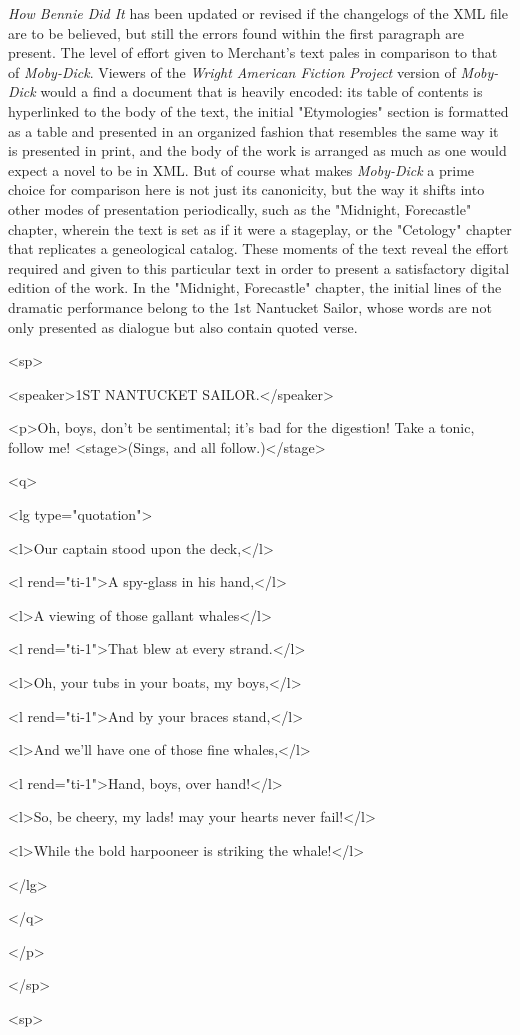 \textit{How Bennie Did It} has been updated or revised if the changelogs of the XML file are to be believed, but still the errors found within the first paragraph are present. The level of effort given to Merchant's text pales in comparison to that of \textit{Moby-Dick}. Viewers of the \textit{Wright American Fiction Project} version of \textit{Moby-Dick} would a find a document that is heavily encoded: its table of contents is hyperlinked to the body of the text, the initial "Etymologies" section is formatted as a table and presented in an organized fashion that resembles the same way it is presented in print, and the body of the work is arranged as much as one would expect a novel to be in XML. But of course what makes \textit{Moby-Dick} a prime choice for comparison here is not just its canonicity, but the way it shifts into other modes of presentation periodically, such as the "Midnight, Forecastle" chapter, wherein the text is set as if it were a stageplay, or the "Cetology" chapter that replicates a geneological catalog. These moments of the text reveal the effort required and given to this particular text in order to present a satisfactory digital edition of the work. In the "Midnight, Forecastle" chapter, the initial lines of the dramatic performance belong to the 1st Nantucket Sailor, whose words are not only presented as dialogue but also contain quoted verse. 

\begin{displayquote}
<sp>
     
     <speaker>1ST NANTUCKET SAILOR.</speaker>
     
     <p>Oh, boys, don't be sentimental; it's bad 
     for the digestion! Take a tonic,
     	follow me! <stage>(Sings, and all follow.)</stage>
        
        <q>
        	
        	<lg type="quotation">

              <l>Our captain stood upon the deck,</l>

              <l rend="ti-1">A spy-glass in his hand,</l>

              <l>A viewing of those gallant whales</l>

              <l rend="ti-1">That blew at every strand.</l>

              <l>Oh, your tubs in your boats, my boys,</l>

              <l rend="ti-1">And by your braces stand,</l>

              <l>And we'll have one of those fine whales,</l>

              <l rend="ti-1">Hand, boys, over hand!</l>

              <l>So, be cheery, my lads! may your hearts 
              never fail!</l>

              <l>While the bold harpooneer is striking 
              the whale!</l>

             </lg>

          </q>

       </p>

	   </sp>

<sp> \autocite{herman_melville_moby_nodate}
\end{displayquote}

